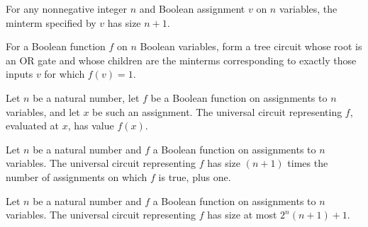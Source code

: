 \begin{theorem}
\label{BoolCircuit.minterm_size}
\leanok
{}
For any nonnegative integer $n$ and Boolean assignment $v$ on $n$ variables, the minterm
specified by $v$ has size $n+1$.
\end{theorem}

\begin{definition}
\label{BoolCircuit.universalCircuit}
\leanok
{}
For a Boolean function $f$ on $n$ Boolean variables, form a tree circuit whose root is
an OR gate and whose children are the minterms corresponding to exactly those inputs $v$
for which $f(v)=1$.
\end{definition}

\begin{theorem}
\label{BoolCircuit.universalCircuit_eval}
\leanok
{}
Let $n$ be a natural number, let $f$ be a Boolean function on assignments to $n$
variables, and let $x$ be such an assignment. The universal circuit representing $f$,
evaluated at $x$, has value $f(x)$.
\end{theorem}

\begin{theorem}
\label{BoolCircuit.universalCircuit_size}
\leanok
{}
Let $n$ be a natural number and $f$ a Boolean function on assignments to $n$ variables.
The universal circuit representing $f$ has size $(n+1)$ times the number of assignments
on which $f$ is true, plus one.
\end{theorem}

\begin{theorem}
\label{BoolCircuit.universalCircuit_size_le}
\leanok
{}
Let $n$ be a natural number and $f$ a Boolean function on assignments to $n$ variables.
The universal circuit representing $f$ has size at most $2^n(n+1)+1$.
\end{theorem}

